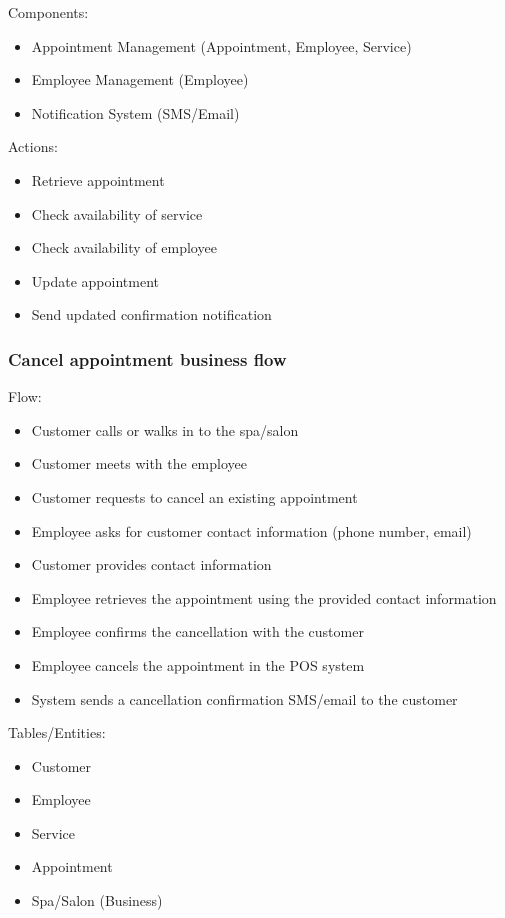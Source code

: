\documentclass[]{VUMIFTemplateClass}
\begin{document}
Components:
\begin{itemize}
    \setlength{\itemsep}{2pt}
    \setlength{\parskip}{0pt}
    \setlength{\parsep}{0pt}
    \item Appointment Management (Appointment, Employee, Service)
    \item Employee Management (Employee)
    \item Notification System (SMS/Email)
\end{itemize}

Actions:
\begin{itemize}
    \setlength{\itemsep}{2pt}
    \setlength{\parskip}{0pt}
    \setlength{\parsep}{0pt}
    \item Retrieve appointment
    \item Check availability of service
    \item Check availability of employee
    \item Update appointment
    \item Send updated confirmation notification
\end{itemize}

\subsubsection{Cancel appointment business flow}
Flow:
\begin{itemize}
    \setlength{\itemsep}{2pt}
    \setlength{\parskip}{0pt}
    \setlength{\parsep}{0pt}
    \item Customer calls or walks in to the spa/salon
    \item Customer meets with the employee
    \item Customer requests to cancel an existing appointment
    \item Employee asks for customer contact information (phone number, email)
    \item Customer provides contact information
    \item Employee retrieves the appointment using the provided contact information
    \item Employee confirms the cancellation with the customer
    \item Employee cancels the appointment in the POS system
    \item System sends a cancellation confirmation SMS/email to the customer
\end{itemize}

Tables/Entities:
\begin{itemize}
    \setlength{\itemsep}{2pt}
    \setlength{\parskip}{0pt}
    \setlength{\parsep}{0pt}
    \item Customer
    \item Employee
    \item Service
    \item Appointment
    \item Spa/Salon (Business)
\end{itemize}
\end{document}
